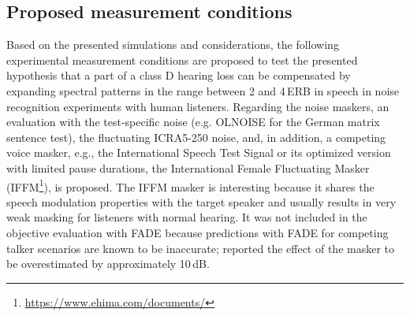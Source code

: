\documentclass[10pt,a4paper,twocolumn]{article}
\begin{document}
\subsection*{Proposed measurement conditions}
%
Based on the presented simulations and considerations, the following experimental measurement conditions are proposed to test the presented hypothesis that a part of a class D hearing loss can be compensated by expanding spectral patterns in the range between 2 and 4\,ERB in speech in noise recognition experiments with human listeners.
%
Regarding the noise maskers, an evaluation with the test-specific noise (e.g. OLNOISE for the German matrix sentence test), the fluctuating ICRA5-250 noise, and, in addition, a competing voice masker, e.g., the International Speech Test Signal \citep[ISTS;][]{holube2010} or its optimized version with limited pause durations, the International Female Fluctuating Masker (IFFM\footnote{\url{https://www.ehima.com/documents/}}), is proposed.
%
The IFFM masker is interesting because it shares the speech modulation properties with the target speaker and usually results in very weak masking for listeners with normal hearing.
%
It was not included in the objective evaluation with FADE because predictions with FADE for competing talker scenarios are known to be inaccurate; \cite{schaedler2018} reported the effect of the masker to be overestimated by approximately 10\,dB.
\end{document}
